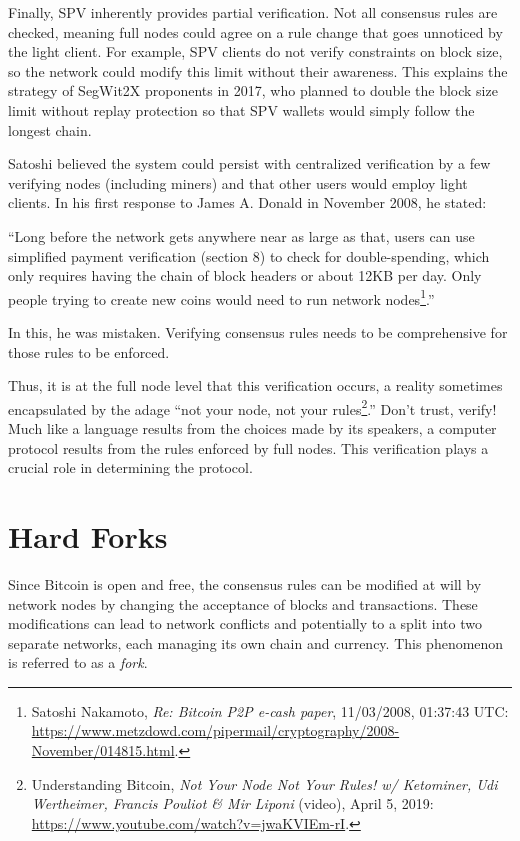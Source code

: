 \documentclass[
  a5paper,
  smalldemyvopaper,10pt,twoside,onecolumn,openright,extrafontsizes,hidelinks]{memoir}
\begin{document}
Finally, SPV inherently provides partial verification. Not all consensus
rules are checked, meaning full nodes could agree on a rule change that
goes unnoticed by the light client. For example, SPV clients do not
verify constraints on block size, so the network could modify this limit
without their awareness. This explains the strategy of SegWit2X
proponents in 2017, who planned to double the block size limit without
replay protection so that SPV wallets would simply follow the longest
chain.

Satoshi believed the system could persist with centralized verification
by a few verifying nodes (including miners) and that other users would
employ light clients. In his first response to James A. Donald in
November 2008, he stated:

``Long before the network gets anywhere near as large as that, users can
use simplified payment verification (section 8) to check for
double-spending, which only requires having the chain of block headers
or about 12KB per day. Only people trying to create new coins would need
to run network nodes\footnote{Satoshi Nakamoto, \emph{Re: Bitcoin P2P
  e-cash paper}, 11/03/2008, 01:37:43 UTC:
  \url{https://www.metzdowd.com/pipermail/cryptography/2008-November/014815.html}.}.''

In this, he was mistaken. Verifying consensus rules needs to be
comprehensive for those rules to be enforced.

Thus, it is at the full node level that this verification occurs, a
reality sometimes encapsulated by the adage ``not your node, not your
rules\footnote{Understanding Bitcoin, \emph{Not Your Node Not Your
  Rules! w/ Ketominer, Udi Wertheimer, Francis Pouliot \& Mir Liponi}
  (video), April 5, 2019:
  \url{https://www.youtube.com/watch?v=jwaKVIEm-rI}.}.'' Don't trust,
verify! Much like a language results from the choices made by its
speakers, a computer protocol results from the rules enforced by full
nodes. This verification plays a crucial role in determining the
protocol.

\section*{Hard Forks}\label{hard-forks}


Since Bitcoin is open and free, the consensus rules can be modified at
will by network nodes by changing the acceptance of blocks and
transactions. These modifications can lead to network conflicts and
potentially to a split into two separate networks, each managing its own
chain and currency. This phenomenon is referred to as a \emph{fork}.
\end{document}
